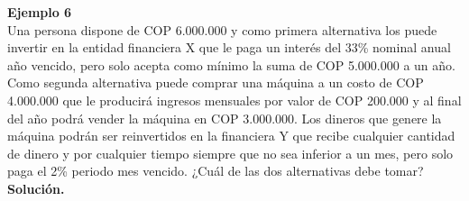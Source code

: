 \textbf{Ejemplo 6}\\
Una persona dispone de  COP  6.000.000 y como primera alternativa los puede invertir en la entidad financiera X que le paga un interés del 33\% nominal anual año vencido, pero solo acepta como mínimo la suma de  COP  5.000.000 a un año. Como segunda alternativa puede comprar una máquina a un costo de  COP  4.000.000 que le producirá ingresos mensuales por valor de  COP  200.000 y al final del año podrá vender la máquina en  COP  3.000.000. Los dineros que genere la máquina podrán ser reinvertidos en la financiera Y que recibe cualquier cantidad de dinero y por cualquier tiempo siempre que no sea inferior a un mes, pero solo paga el 2\% periodo mes vencido. ¿Cuál de las dos alternativas debe tomar?
\\

\textbf{Solución.}\\
